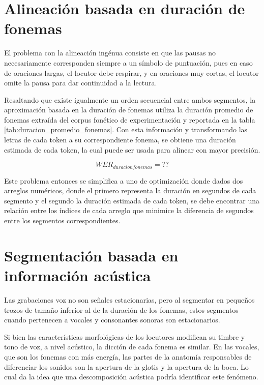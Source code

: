 \section{Alineación basada en duración de fonemas}

El problema con la alineación ingénua consiste en que las pausas no necesariamente corresponden siempre a un símbolo de puntuación, pues en caso de oraciones largas, el locutor debe respirar, y en oraciones muy cortas, el locutor omite la pausa para dar continuidad a la lectura.

Resaltando que existe igualmente un orden secuencial entre ambos segmentos, la aproximación basada en la duración de fonemas utiliza la duración promedio de fonemas extraída del corpus fonético de experimentación y reportada en la tabla \ref{tab:duracion_promedio_fonemas}. Con esta información y transformando las letras de cada token a su correspondiente fonema, se obtiene una duración estimada de cada token, la cual puede ser usada para alinear con mayor precisión.

\begin{equation}
    WER_{duracion fonemas} = ??
\end{equation}



Este problema entonces se simplifica a uno de optimización donde dados dos arreglos numéricos, donde el primero representa la duración en segundos de cada segmento y el segundo la duración estimada de cada token, se debe encontrar una relación entre los índices de cada arreglo que minimice la diferencia de segundos entre los segmentos correspondientes.

\section{Segmentación basada en información acústica}

Las grabaciones voz no son señales estacionarias, pero al segmentar en pequeños trozos de tamaño inferior al de la duración de los fonemas, estos segmentos cuando pertenecen a vocales y consonantes sonoras son estacionarios.

Si bien las características morfológicas de los locutores modifican su timbre y tono de voz, a nivel acústico, la dicción de cada fonema es similar. En las vocales, que son los fonemas con más energía, las partes de la anatomía responsables de diferenciar los sonidos son la apertura de la glotis y la apertura de la boca. Lo cual da la idea que una descomposición acústica podría identificar este fenómeno.

